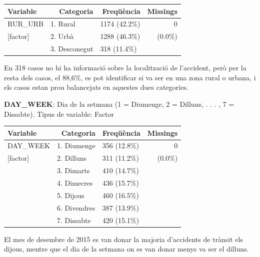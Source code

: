 \documentclass[12pt,longbibliography]{article}
\theoremstyle{definition}
\theoremstyle{remark}
\begin{document}
\begin{table}[H]
\centering
\begin{tabular}{lllr}
\hline
Variable     & \multicolumn{1}{r}{Categoria} & \multicolumn{1}{r}{Freqüència} & Missings  \\ \hline
RUR\_URB     & 1. Rural                      & 1174 (42.2\%)                  & 0  \\
{[}factor{]} & 2. Urbà                       & 1288 (46.3\%)                  &      (0.0\%)     \\
             & 3. Desconegut                 & 318 (11.4\%)                   &           \\ \hline
\end{tabular}
\end{table}

En 318 casos no hi ha informació sobre la localització de l'accident, però per la resta dels casos, el 88,6\%, es pot identificar si va ser en una zona rural o urbana, i els casos estan prou balancejats en aquestes dues categories.


\textbf{DAY\_WEEK}: Dia de la setmana (1 = Diumenge, 2 = Dilluns, . . . , 7 = Dissabte). Tipus de variable: Factor



\begin{table}[H]
\centering
\begin{tabular}{llll}
\hline
Variable & \multicolumn{1}{r}{Categoria} & \multicolumn{1}{r}{Freqüència} & \multicolumn{1}{r}{Missings} \\ \hline
DAY\_WEEK    & 1. Diumenge  & 356 (12.8\%) & \multicolumn{1}{r}{0} \\
{[}factor{]} & 2. Dilluns   & 311 (11.2\%) & \multicolumn{1}{r}{(0.0\%)}          \\
             & 3. Dimarts   & 410 (14.7\%) & \multicolumn{1}{r}{}          \\
             & 4. Dimecres  & 436 (15.7\%) &                               \\
             & 5. Dijous    & 460 (16.5\%) &                               \\
             & 6. Divendres & 387 (13.9\%) &                               \\
             & 7. Dissabte  & 420 (15.1\%) &                              \\ \hline
\end{tabular}
\end{table}

El mes de desembre de 2015 es van donar la majoria d'accidents de trànsit els dijous, mentre que el dia de la setmana on es van donar menys va ser el dilluns.
\end{document}
